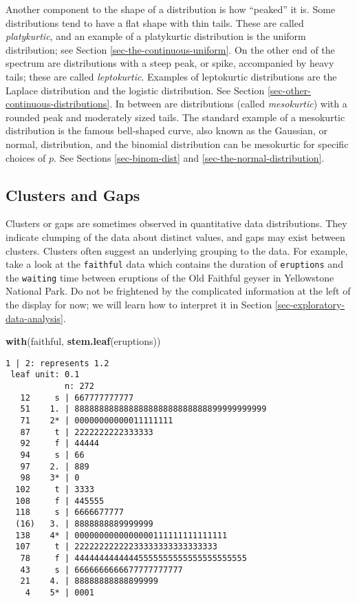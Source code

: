 \documentclass[]{book}
\newenvironment{Shaded}{\begin{snugshade}}{\end{snugshade}}
\newcommand{\KeywordTok}[1]{\textcolor[rgb]{0.13,0.29,0.53}{\textbf{{#1}}}}
\newcommand{\NormalTok}[1]{{#1}}
\numberwithin{equation}{chapter}
\numberwithin{figure}{chapter}
\theoremstyle{plain}
\theoremstyle{definition}
\theoremstyle{remark}
\theoremstyle{definition}
\theoremstyle{definition}
\theoremstyle{remark}
\begin{document}
Another component to the shape of a distribution is how ``peaked'' it
is. Some distributions tend to have a flat shape with thin tails. These
are called \emph{platykurtic}, and an example of a platykurtic
distribution is the uniform distribution; see Section
\ref{sec-the-continuous-uniform}. On the other end of the spectrum are
distributions with a steep peak, or spike, accompanied by heavy tails;
these are called \emph{leptokurtic}. Examples of leptokurtic
distributions are the Laplace distribution and the logistic
distribution. See Section \ref{sec-other-continuous-distributions}. In
between are distributions (called \emph{mesokurtic}) with a rounded peak
and moderately sized tails. The standard example of a mesokurtic
distribution is the famous bell-shaped curve, also known as the
Gaussian, or normal, distribution, and the binomial distribution can be
mesokurtic for specific choices of \(p\). See Sections
\ref{sec-binom-dist} and \ref{sec-the-normal-distribution}.

\subsection{Clusters and Gaps}\label{sub-clusters-and-gaps}

Clusters or gaps are sometimes observed in quantitative data
distributions. They indicate clumping of the data about distinct values,
and gaps may exist between clusters. Clusters often suggest an
underlying grouping to the data. For example, take a look at the
\texttt{faithful} data which contains the duration of \texttt{eruptions}
and the \texttt{waiting} time between eruptions of the Old Faithful
geyser in Yellowstone National Park. Do not be frightened by the
complicated information at the left of the display for now; we will
learn how to interpret it in Section
\ref{sec-exploratory-data-analysis}.

\begin{Shaded}
\begin{Highlighting}[]
\KeywordTok{with}\NormalTok{(faithful, }\KeywordTok{stem.leaf}\NormalTok{(eruptions))}
\end{Highlighting}
\end{Shaded}

\begin{verbatim}
1 | 2: represents 1.2
 leaf unit: 0.1
            n: 272
   12     s | 667777777777
   51    1. | 888888888888888888888888888899999999999
   71    2* | 00000000000011111111
   87     t | 2222222222333333
   92     f | 44444
   94     s | 66
   97    2. | 889
   98    3* | 0
  102     t | 3333
  108     f | 445555
  118     s | 6666677777
  (16)   3. | 8888888889999999
  138    4* | 0000000000000000111111111111111
  107     t | 22222222222233333333333333333
   78     f | 44444444444445555555555555555555555
   43     s | 6666666666677777777777
   21    4. | 88888888888899999
    4    5* | 0001
\end{verbatim}
\end{document}
